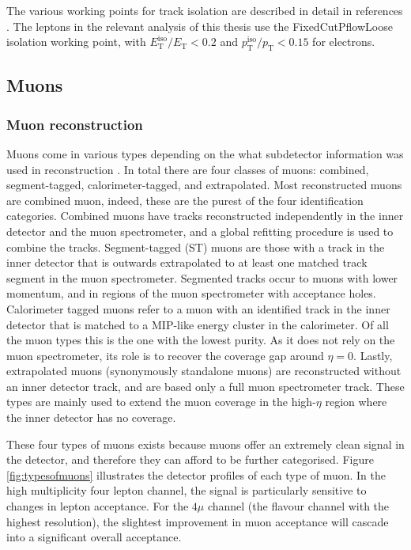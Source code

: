The various working points for track isolation are described in detail in references \cite{ATLAS_electron_efficiency_2015-2016,ATLAS_electron_efficiency_2015-2017}. The leptons in the relevant analysis of this thesis use the FixedCutPflowLoose isolation working point, with $E_{\text{T}}^{\text{iso}}/E_{\text{T}}<0.2$ and $p_{\text{T}}^{\text{iso}}/p_{\text{T}}<0.15$ for electrons. 

\subsection{Muons}
\subsubsection{Muon reconstruction}

Muons come in various types depending on the what subdetector information was used in reconstruction \cite{ATLAS_muon_reco_2015}. In total there are four classes of muons: combined, segment-tagged, calorimeter-tagged, and extrapolated. Most reconstructed muons are combined muon, indeed, these are the purest of the four identification categories. Combined muons have tracks reconstructed independently in the inner detector and the muon spectrometer, and a global refitting procedure is used to combine the tracks. Segment-tagged (ST) muons are those with a track in the inner detector that is outwards extrapolated to at least one matched track segment in the muon spectrometer. Segmented tracks occur to muons with lower momentum, and in regions of the muon spectrometer with acceptance holes. Calorimeter tagged muons refer to a muon with an identified track in the inner detector that is matched to a MIP-like energy cluster in the calorimeter. Of all the muon types this is the one with the lowest purity. As it does not rely on the muon spectrometer, its role is to recover the coverage gap around $\eta=0$. Lastly, extrapolated muons (synonymously standalone muons) are reconstructed without an inner detector track, and are based only a full muon spectrometer track. These types are mainly used to extend the muon coverage in the high-$\eta$ region where the inner detector has no coverage. 

These four types of muons exists because muons offer an extremely clean signal in the detector, and therefore they can afford to be further categorised. Figure \ref{fig:typesofmuons} illustrates the detector profiles of each type of muon. In the high multiplicity four lepton channel, the signal is particularly sensitive to changes in lepton acceptance. For the $4\mu$ channel (the flavour channel with the highest resolution), the slightest improvement in muon acceptance will cascade into a significant overall acceptance. 

